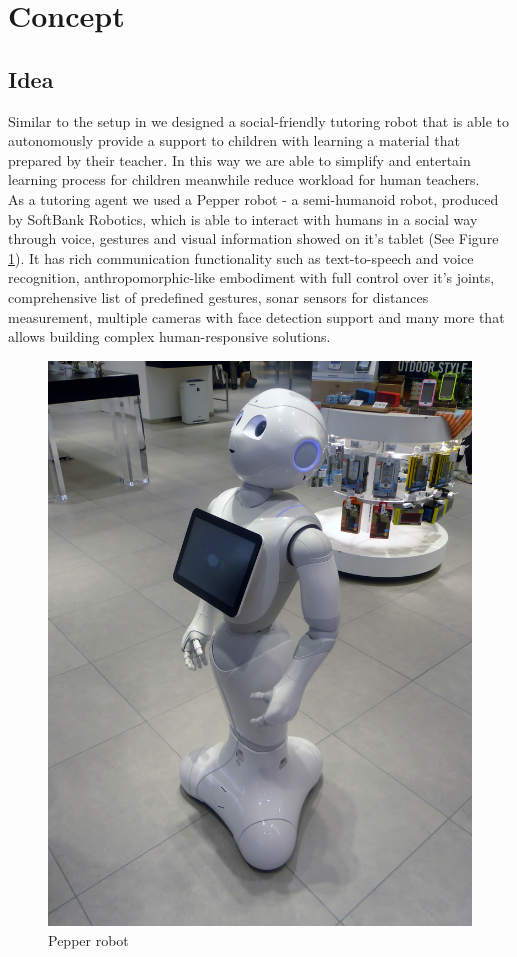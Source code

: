 \documentclass[12pt]{article}
\begin{document}
\newpage
\section{Concept}
\subsection{Idea}
\label{sect_idea}
Similar to the setup in \cite{Park:2017:GGM:2909824.3020213} we designed a social-friendly tutoring robot that is able to autonomously provide a support to children with learning a material that prepared by their teacher. In this way we are able to simplify and entertain learning process for children meanwhile reduce workload for human teachers.
\\
As a tutoring agent we used a Pepper robot - a semi-humanoid robot, produced by SoftBank Robotics, which is able to interact with humans in a social way through voice, gestures and visual information showed on it's tablet (See Figure \ref{pepper}). It has rich communication functionality  such as text-to-speech and voice recognition, anthropomorphic-like embodiment with full control over it's joints, comprehensive list of predefined gestures, sonar sensors for distances measurement, multiple cameras with face detection support and many more that allows building complex human-responsive solutions.
\begin{figure}[!h]
\begin{center}
\includegraphics[scale=0.3]{images/pepper.jpg}
\caption{Pepper robot}
\label{pepper}
\end{center}
\end{figure}
\end{document}
